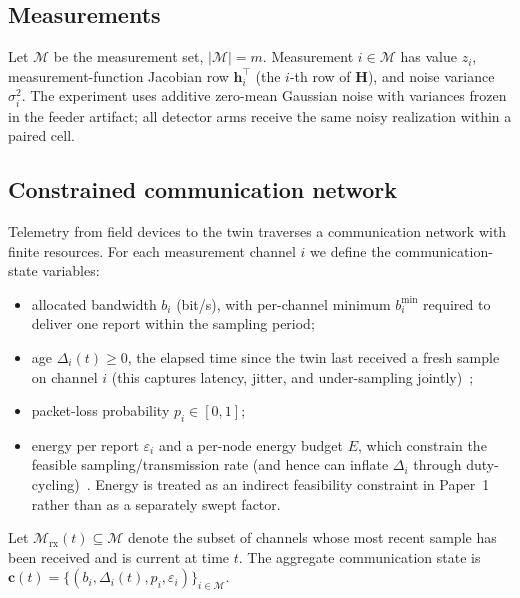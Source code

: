 \documentclass[journal]{IEEEtran}
\theoremstyle{plain}
\theoremstyle{definition}
\theoremstyle{remark}
\newcommand{\bh}{\mathbf{h}}
\newcommand{\bH}{\mathbf{H}}
\newcommand{\bc}{\mathbf{c}}
\newcommand{\Mrx}{\mathcal{M}_{\mathrm{rx}}}
\begin{document}
\subsection{Measurements}
Let $\mathcal{M}$ be the measurement set, $|\mathcal{M}|=m$. Measurement
$i\in\mathcal{M}$ has value $z_i$, measurement-function Jacobian row
$\bh_i^{\top}$ (the $i$-th row of $\bH$), and noise variance
$\sigma_i^{2}$. The experiment uses additive zero-mean Gaussian noise
with variances frozen in the feeder artifact; all detector arms receive
the same noisy realization within a paired cell.

\subsection{Constrained communication network}
Telemetry from field devices to the twin traverses a communication network
with finite resources. For each measurement channel $i$ we define the
communication-state variables:
\begin{itemize}
\item allocated bandwidth $b_i$ (bit/s), with per-channel minimum
$b_i^{\min}$ required to deliver one report within the sampling period;
\item age $\Delta_i(t)\ge0$, the elapsed time since the twin last received
a fresh sample on channel $i$ (this captures latency, jitter, and
under-sampling jointly)~\cite{kaul2012,yates2021};
\item packet-loss probability $p_i\in[0,1]$;
\item energy per report $\varepsilon_i$ and a per-node energy budget $E$,
which constrain the feasible sampling/transmission rate (and hence can
inflate $\Delta_i$ through duty-cycling)~\cite{shi2011}. Energy is treated
as an indirect feasibility constraint in Paper~1 rather than as a
separately swept factor.
\end{itemize}
Let $\Mrx(t)\subseteq\mathcal{M}$ denote the subset of channels whose most
recent sample has been received and is current at time $t$. The aggregate
communication state is
$\bc(t)=\{(b_i,\Delta_i(t),p_i,\varepsilon_i)\}_{i\in\mathcal{M}}$.
\end{document}
